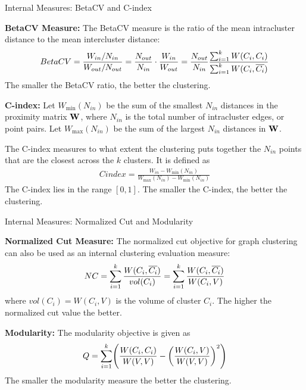 \begin{frame}{Internal Measures: BetaCV and C-index}

{\bf BetaCV Measure:} The BetaCV measure is the
ratio of the mean intracluster distance to the mean intercluster
distance:
\begin{align*}
  BetaCV = \frac{W_{in}/N_{in}}{W_{out}/N_{out}} =
  \frac{N_{out}}{N_{in}} \cdot \frac{W_{in}}{W_{out}}
  = \frac{N_{out}}{N_{in}}
  \frac{\sum_{i=1}^k W(C_i, C_i)}{\sum_{i=1}^k
  W(C_i, \overline{C_i})}
\end{align*}
The smaller the BetaCV ratio, the better the clustering.

\bigskip
{\bf C-index:} Let $W_{\min}(N_{in})$ be the sum of the
smallest $N_{in}$ distances in the proximity matrix $\mathbf{W}$, where
$N_{in}$ is the total number of intracluster edges, or point
pairs. Let $W_{\max}(N_{in})$ be the sum of the largest $N_{in}$
distances in $\mathbf{W}$.

\smallskip
The C-index measures to what extent the clustering puts together the
$N_{in}$
points that are the closest across the $k$ clusters.
It is def\/{i}ned as
\begin{align*}
  Cindex = \frac{W_{in} -
  W_{\min}(N_{in})}{W_{\max}(N_{in})-W_{\min}(N_{in})}
\end{align*}
The C-index lies in the range $[0,1]$.
The smaller the C-index, the better the clustering.
\end{frame}


\begin{frame}{Internal Measures: Normalized Cut and Modularity}

  {\bf Normalized Cut Measure:} The normalized cut
objective for graph clustering can
also be used as an internal clustering evaluation measure:
\begin{align*}
NC = \sum_{i=1}^k {W(C_i, \overline{C_i}) \over vol(C_i)} =
\sum_{i=1}^k {W(C_i, \overline{C_i}) \over W(C_i, V)}
\end{align*}
where $vol(C_i) = W(C_i,V)$ is the volume of cluster $C_i$.
The higher the normalized cut value the better.

\bigskip
{\bf Modularity:}
The modularity objective is given as
\begin{align*}
Q = \sum_{i=1}^k \Biggl(
    {W(C_i,C_i) \over W(V,V)} -
    \left({W(C_i,V) \over W(V,V)}\right)^2
    \Biggr)
\end{align*}
The smaller the modularity measure the better the clustering.
\end{frame}


